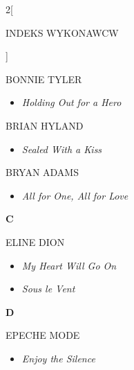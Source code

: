 \documentclass[a4paper]{report}
\begin{document}
\begin{multicols*}{2}[\begin{Huge}INDEKS WYKONAWCW\end{Huge}\vspace{1cm}]
\begin{minipage}{\columnwidth}
\end{minipage}
\begin{minipage}{\columnwidth}
	BONNIE TYLER 
	\begin{itemize}[topsep=3pt, after=\vspace{3mm}]
		\itemsep0em
		\item[]\textit{Holding Out for a Hero}  \\
	\end{itemize}
\end{minipage}
\begin{minipage}{\columnwidth}
	BRIAN HYLAND 
	\begin{itemize}[topsep=3pt, after=\vspace{3mm}]
		\itemsep0em
		\item[]\textit{Sealed With a Kiss}  \\
	\end{itemize}
\end{minipage}
\begin{minipage}{\columnwidth}
	BRYAN ADAMS 
	\begin{itemize}[topsep=3pt, after=\vspace{3mm}]
		\itemsep0em
		\item[]\textit{All for One, All for Love}  \\
	\end{itemize}
\end{minipage}
\begin{minipage}{\columnwidth}
	\begin{Large}\textbf{C}\end{Large}ELINE DION 
	\begin{itemize}[topsep=3pt, after=\vspace{3mm}]
		\itemsep0em
		\item[]\textit{My Heart Will Go On}  \\
		\item[]  \textit{Sous le Vent}  \\
	\end{itemize}
\end{minipage}
\begin{minipage}{\columnwidth}
	\begin{Large}\textbf{D}\end{Large}EPECHE MODE 
	\begin{itemize}[topsep=3pt, after=\vspace{3mm}]
		\itemsep0em
		\item[]\textit{Enjoy the Silence}  \\

\end{itemize}
\end{minipage}
\end{multicols*}
\end{document}
